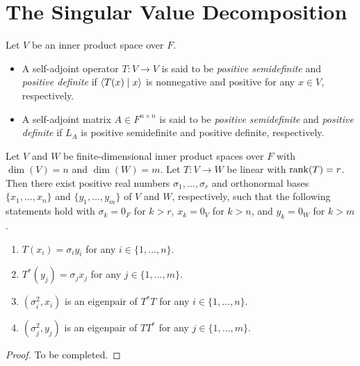 \section{The Singular Value Decomposition}
\begin{definition}
  Let $V$ be an inner product space over $F$.
  \begin{itemize}
    \item A self-adjoint operator $T: V \to V$ is said to be
    \emph{positive semidefinite} and \emph{positive definite} if
    $\left\langle T(x) \; \middle| \; x \right\rangle$ is nonnegative and positive for any $x \in V$,
    respectively.
    \item A self-adjoint matrix $A \in F^{n \times n}$ is said to be
    \emph{positive semidefinite} and \emph{positive definite} if
    $L_A$ is positive semidefinite and positive definite, respectively.
  \end{itemize}
\end{definition}

\begin{theorem}
  Let $V$ and $W$ be finite-dimensional inner product spaces over $F$ with
  $\dim(V) = n$ and $\dim(W) = m$.
  Let $T: V \to W$ be linear with $\operatorname{rank}(T) = r$.
  Then there exist positive real numbers $\sigma_1, \dots, \sigma_r$
  and orthonormal bases $\{x_1, \dots, x_n\}$ and $\{y_1, \dots, y_m\}$
  of $V$ and $W$, respectively, such that the following statements hold with
  $\sigma_k = 0_F$ for $k > r$, $x_k = 0_V$ for $k > n$, and $y_k = 0_W$ for
  $k > m$.
  \begin{enumerate}
    \item $T(x_i) = \sigma_iy_i$ for any $i \in \{1, \dots, n\}$.
    \item $T^*(y_j) = \sigma_jx_j$ for any $j \in \{1, \dots, m\}$.
    \item $(\sigma_i^2, x_i)$ is an eigenpair of $T^*T$ for any
    $i \in \{1, \dots, n\}$.
    \item $(\sigma_j^2, y_j)$ is an eigenpair of $TT^*$ for any
    $j \in \{1, \dots, m\}$.
  \end{enumerate}
\end{theorem}
\begin{proof}
  To be completed.
\end{proof}